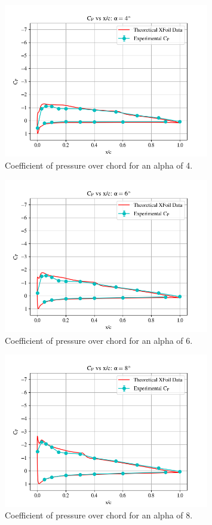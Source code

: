 \documentclass[11pt, letterpaper]{article}
\begin{document}
\begin{appendices}
\begin{figure}[!hpt]
        \centering        
        \includegraphics[width=0.8\textwidth]{Figures/C_p-a4.png}
        \caption{Coefficient of pressure over chord for an alpha of 4\degree.}
        \label{fig:C_p-a4}
\end{figure}

\begin{figure}[!hpt]
        \centering        
        \includegraphics[width=0.8\textwidth]{Figures/C_p-a6.png}
        \caption{Coefficient of pressure over chord for an alpha of 6\degree.}
        \label{fig:C_p-a6}
\end{figure}

\begin{figure}[!hpt]
        \centering        
        \includegraphics[width=0.8\textwidth]{Figures/C_p-a8.png}
        \caption{Coefficient of pressure over chord for an alpha of 8\degree.}
        \label{fig:C_p-a8}
\end{figure}


\end{appendices}
\end{document}
